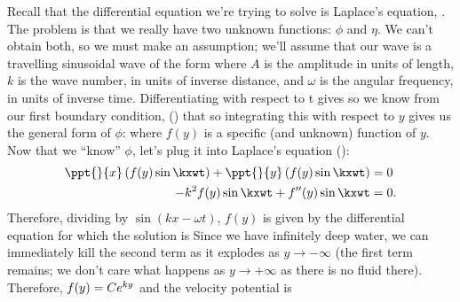 \documentclass[12pt]{book}
\begin{document}
Recall that the differential equation  we're trying to solve is Laplace's equation, .  The problem is that we really have two unknown functions: $\phi$ and $\eta$.  We can't obtain both, so we must make an assumption; we'll assume that our  wave is a travelling sinusoidal wave of the form
where $A$ is the amplitude in units of length, $k$ is the wave number, in units of inverse distance, and $\omega$ is the angular frequency, in units of inverse time.  Differentiating  with respect to t gives
 so we know from our first boundary condition, () that
 so integrating this with respect to $y$ gives us the general form of $\phi$:
where $f(y)$ is a specific (and unknown) function of $y$.  Now that we ``know'' $\phi$, let's plug it into Laplace's equation ():
\begin{align*}
\ppt{}{x}\left(   f(y)\sin\kxwt \right)  + \ppt{}{y}\left( f(y)\sin\kxwt\right)&=0\\
-k^2f(y)\sin\kxwt + f''(y)\sin\kxwt &= 0.
\end{align*}
Therefore, dividing by $\sin(kx-\omega t)$, $f(y)$ is given by the differential equation
for which the solution is
Since we have infinitely deep water, we can immediately kill the second term as it explodes as \mbox{$y\to-\infty$} (the first term remains; we don't care what happens as $y\to+\infty$ as there is no fluid there). Therefore, $f(y)=Ce^{ky}$ and the velocity potential is
\end{document}
